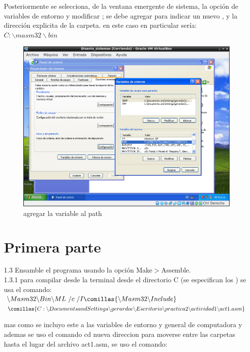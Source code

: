   Posteriormente se selecciona, de la ventana emergente de sistema, la opción de variables de entorno y modificar ;
  se debe agregar \comillas{;} para indicar un nuevo , y la dirección explicita de la carpeta. en este caso en particular sería: 
  $C:\backslash masm32 \backslash bin$
\begin{figure}[H]
  \includegraphics[width=\linewidth]{practica2/imagenes/path/2.png}
  \caption{agregar la variable al path}
\end{figure}



\section{Primera parte}

\large{1.3} Ensamble el programa usando la opción Make$>$Assemble.\\
  

\large{1.3.1} para compilar desde la terminal desde el directorio C (se especifican los ) se usa el comando: \\
$\backslash Masm32\backslash Bin\backslash ML \  /c \  /I\comillas{\backslash Masm32\backslash Include}\ $\\
$\comillas{C:\backslash Documents and Settings\backslash gerardoc\backslash Escritorio\backslash practica2\backslash actividad1\backslash act1.asm}$ 

 mas como se incluyo este a las variables de entorno y  general de computadora y ademas se uso el comando cd nueva direccion para moverse entre las carpetas hasta el lugar del archivo act1.asm, se uso el comando: \\


